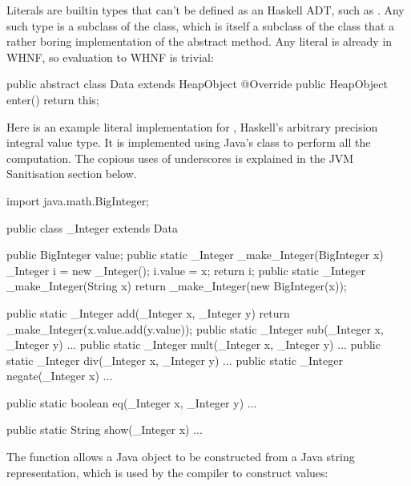 \documentclass[dissertation.tex]{subfiles}
\begin{document}
{{{            Literals are builtin types that can't be defined as an Haskell ADT, such as . Any such type
            is a subclass of the  class, which is itself a subclass of the  class that a
            rather boring implementation of the abstract  method. Any literal is already in WHNF, so
            evaluation to WHNF is trivial:

            \begin{javafigure}
            public abstract class Data extends HeapObject {
                @Override
                public HeapObject enter() {
                    return this;
                }
            }
            \end{javafigure}

            Here is an example literal implementation for , Haskell's arbitrary precision integral
            value type. It is implemented using Java's  class to perform all the computation. The
            copious uses of underscores is explained in the JVM Sanitisation section below.

            \begin{javafigure}
            import java.math.BigInteger;

            public class _Integer extends Data {
                public BigInteger value;
                public static _Integer _make_Integer(BigInteger x) {
                    _Integer i = new _Integer();
                    i.value = x;
                    return i;
                }
                public static _Integer _make_Integer(String x) {
                    return _make_Integer(new BigInteger(x));
                }

                public static _Integer add(_Integer x, _Integer y) {
                    return _make_Integer(x.value.add(y.value));
                }
                public static _Integer sub(_Integer x, _Integer y) { ... }
                public static _Integer mult(_Integer x, _Integer y) { ... }
                public static _Integer div(_Integer x, _Integer y) { ... }
                public static _Integer negate(_Integer x) { ... }

                public static boolean eq(_Integer x, _Integer y) { ... }

                public static String show(_Integer x) { ... }
            }
            \end{javafigure}

            The  function allows a Java  object to be constructed from a
            Java string representation, which is used by the compiler to construct  values:

}}}
\end{document}
